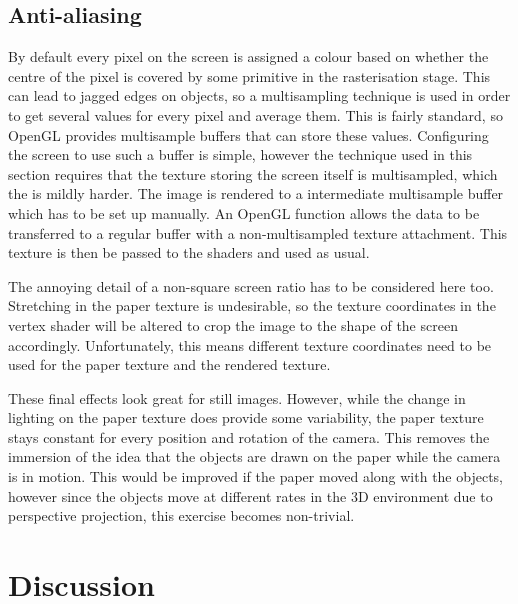 \documentclass[a4paper, 12pt]{article}
\begin{document}
\subsection{Anti-aliasing}
By default every pixel on the screen is assigned a colour based on whether the centre of the pixel is covered by some primitive in the rasterisation stage. This can lead to jagged edges on objects, so a multisampling technique is used in order to get several values for every pixel and average them. This is fairly standard, so OpenGL provides multisample buffers that can store these values. Configuring the screen to use such a buffer is simple, however the technique used in this section requires that the texture storing the screen itself is multisampled, which the is mildly harder. The image is rendered to a intermediate multisample buffer which has to be set up manually. An OpenGL function allows the data to be transferred to a regular buffer with a non-multisampled texture attachment. This texture is then be passed to the shaders and used as usual.


The annoying detail of a non-square screen ratio has to be considered here too. Stretching in the paper texture is undesirable, so the texture coordinates in the vertex shader will be altered to crop the image to the shape of the screen accordingly. Unfortunately, this means different texture coordinates need to be used for the paper texture and the rendered texture.

These final effects look great for still images. However, while the change in lighting on the paper texture does provide some variability, the paper texture stays constant for every position and rotation of the camera. This removes the immersion of the idea that the objects are drawn on the paper while the camera is in motion. This would be improved if the paper moved along with the objects, however since the objects move at different rates in the 3D environment due to perspective projection, this exercise becomes non-trivial.



\section{Discussion}
\end{document}
